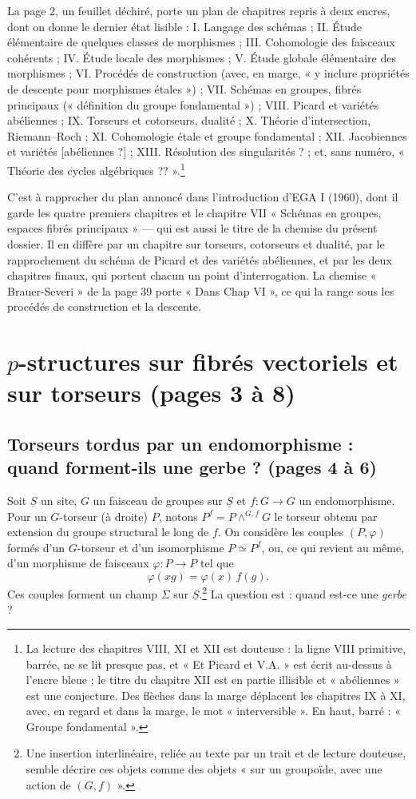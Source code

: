 \documentclass[11pt,a4paper]{article}
\begin{document}
La page 2, un feuillet déchiré, porte un plan de chapitres repris à deux
encres, dont on donne le dernier état lisible : I. Langage des schémas ;
II. Étude élémentaire de quelques classes de morphismes ; III. Cohomologie
des faisceaux cohérents ; IV. Étude locale des morphismes ; V. Étude globale
élémentaire des morphismes ; VI. Procédés de construction (avec, en marge,
« y inclure propriétés de descente pour morphismes étales ») ;
VII. Schémas en groupes, fibrés principaux (« définition du groupe
fondamental ») ; VIII. Picard et variétés abéliennes ; IX. Torseurs et
cotorseurs, dualité ; X. Théorie d'intersection, Riemann–Roch ;
XI. Cohomologie étale et groupe fondamental ; XII. Jacobiennes et variétés
[abéliennes ?] ; XIII. Résolution des singularités ? ; et, sans numéro,
« Théorie des cycles algébriques ?? ».\footnote{La lecture des chapitres VIII,
XI et XII est douteuse : la ligne VIII primitive, barrée, ne se lit presque
pas, et « Et Picard et V.A. » est écrit au-dessus à l'encre bleue ; le titre
du chapitre XII est en partie illisible et « abéliennes » est une conjecture.
Des flèches dans la marge déplacent les chapitres IX à XI, avec, en regard et dans la marge, le mot « interversible ». En haut,
barré : « Groupe fondamental ».}

C'est à rapprocher du plan annoncé dans l'introduction d'EGA I (1960), dont
il garde les quatre premiers chapitres et le chapitre VII « Schémas en
groupes, espaces fibrés principaux » — qui est aussi le titre de la chemise
du présent dossier. Il en diffère par un chapitre sur torseurs, cotorseurs et
dualité, par le rapprochement du schéma de Picard et des variétés abéliennes,
et par les deux chapitres finaux, qui portent chacun un point
d'interrogation. La chemise « Brauer-Severi » de la page 39 porte « Dans Chap
VI », ce qui la range sous les procédés de construction et la descente.

\section*{$p$-structures sur fibrés vectoriels et sur torseurs (pages 3 à 8)}

\subsection*{Torseurs tordus par un endomorphisme : quand forment-ils une gerbe ? (pages 4 à 6)}

Soit $\underline{S}$ un site, $G$ un faisceau de groupes sur $\underline{S}$
et $f : G \to G$ un endomorphisme. Pour un $G$-torseur (à droite) $P$, notons
$P^{f} = P \wedge^{G, f} G$ le torseur obtenu par extension du groupe
structural le long de $f$. On considère les couples $(P, \varphi)$ formés d'un
$G$-torseur et d'un isomorphisme $P \simeq P^{f}$, ou, ce qui revient au
même, d'un morphisme de faisceaux $\varphi : P \to P$ tel que
\[
\varphi(xg) = \varphi(x)\,f(g).
\]
Ces couples forment un champ $\Sigma$ sur $\underline{S}$.\footnote{Une
insertion interlinéaire, reliée au texte par un trait et de lecture douteuse,
semble décrire ces objets comme des objets « sur un groupoïde, avec une
action de $(G, f)$ ».} La question est : quand est-ce une \emph{gerbe} ?
\end{document}
